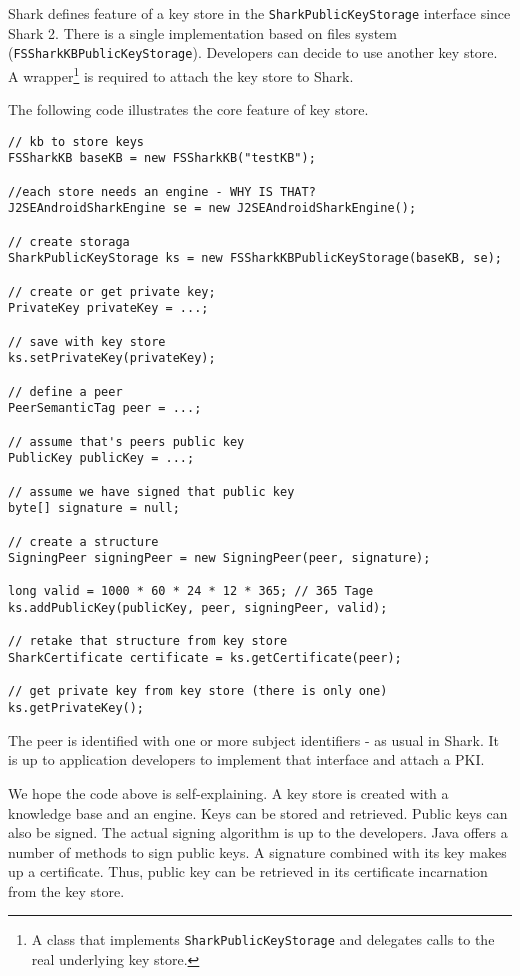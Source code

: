 Shark defines feature of a key store in the {\tt SharkPublicKeyStorage} interface since Shark 2. There is a single implementation based on files system ({\tt FSSharkKBPublicKeyStorage}). Developers can decide to use another key store. A wrapper\footnote{A class that implements {\tt SharkPublicKeyStorage} and delegates calls to the real underlying key store.} is required to attach the key store to Shark.

The following code illustrates the core feature of key store.

\begin{verbatim}
// kb to store keys
FSSharkKB baseKB = new FSSharkKB("testKB");

//each store needs an engine - WHY IS THAT?
J2SEAndroidSharkEngine se = new J2SEAndroidSharkEngine();

// create storaga
SharkPublicKeyStorage ks = new FSSharkKBPublicKeyStorage(baseKB, se);

// create or get private key;
PrivateKey privateKey = ...;

// save with key store
ks.setPrivateKey(privateKey);

// define a peer
PeerSemanticTag peer = ...;

// assume that's peers public key
PublicKey publicKey = ...;

// assume we have signed that public key
byte[] signature = null;

// create a structure
SigningPeer signingPeer = new SigningPeer(peer, signature);

long valid = 1000 * 60 * 24 * 12 * 365; // 365 Tage
ks.addPublicKey(publicKey, peer, signingPeer, valid);

// retake that structure from key store
SharkCertificate certificate = ks.getCertificate(peer);

// get private key from key store (there is only one)
ks.getPrivateKey();
\end{verbatim}

The peer is identified with one or more subject identifiers - as usual in Shark.
It is up to application developers to implement that interface and attach a PKI.

We hope the code above is self-explaining. A key store is created with a knowledge base and an engine. Keys can be stored and retrieved. Public keys can also be signed. The actual signing algorithm is up to the developers. Java offers a number of methods to sign public keys. A signature combined with its key makes up a certificate. Thus, public key can be retrieved in its certificate incarnation from the key store.

